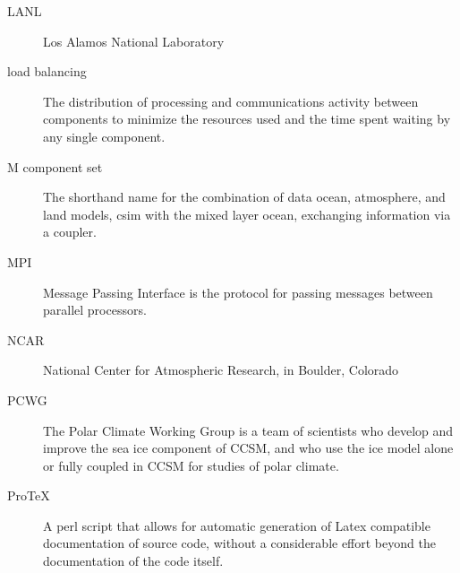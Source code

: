 \begin{description}
\item [LANL] Los Alamos National Laboratory

\item [load balancing]  The distribution of processing and communications
                        activity between components to minimize the resources used and the
                        time spent waiting by any single component. 

\item [M component set] The shorthand name for the combination of 
                        data ocean, atmosphere, and land models,
                        csim with the mixed layer ocean, exchanging
                        information via a coupler.

\item [MPI] Message Passing Interface is the protocol for passing messages
                             between parallel processors.

\item [NCAR] National Center for Atmospheric Research, in Boulder, Colorado

\item [PCWG] The Polar Climate Working Group is a team of scientists
             who develop and improve the sea ice component of CCSM,
             and who use the ice model alone or fully coupled in
             CCSM for studies of polar climate.

\item [ProTeX]  A perl script  that allows for automatic generation of
                Latex compatible documentation of source code, without a
                considerable effort beyond the documentation of the code itself. 

\end{description}








